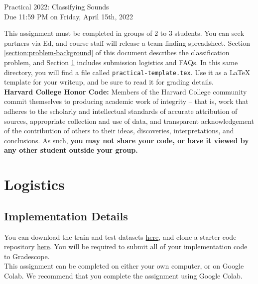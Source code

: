 \documentclass[12pt]{article}
\begin{document}
\begin{center}
{\Large Practical 2022: Classifying Sounds}\\
\vspace{0.25 cm} Due 11:59 PM on Friday, April 15th, 2022\\
\end{center}

\noindent This assignment must be completed in groups of 2 to 3 students. You can seek partners via Ed, and course staff will release a team-finding spreadsheet. Section \ref{section:problem-background} of this document describes the classification problem, and Section \ref{section:logistics} includes submission logistics and FAQs. In this same directory, you will find a file called \texttt{practical-template.tex}. Use it as a \LaTeX \hspace{1pt} template for your writeup, and be sure to read it for grading details. \\

\noindent \textbf{Harvard College Honor Code:} Members of the Harvard College community commit themselves to producing academic work of integrity – that is, work that adheres to the scholarly and intellectual standards of accurate attribution of sources, appropriate collection and use of data, and transparent acknowledgement of the contribution of others to their ideas, discoveries, interpretations, and conclusions. As such, \textbf{you may not share your code, or have it viewed by any other student outside your group.}


\section{Logistics}\label{section:logistics}

\subsection{Implementation Details}

You can download the train and test datasets \href{https://console.cloud.google.com/storage/browser/cs181_practical_data}{here}, and clone a starter code repository \href{https://github.com/harvard-ml-courses/cs181-s21-homeworks/tree/main/practical}{here}.  You will be required to submit all of your implementation code to Gradescope.\\

\noindent This assignment can be completed on either your own computer, or on Google Colab.  We recommend that you complete the assignment using Google Colab.
\end{document}
